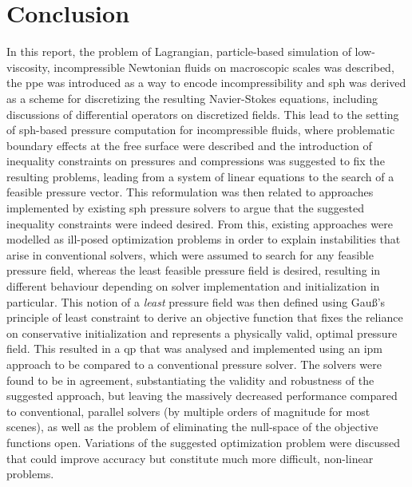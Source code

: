 \documentclass[conference]{IEEEtran}
\begin{document}
\section{Conclusion}
In this report, the problem of Lagrangian, particle-based simulation of low-viscosity, incompressible Newtonian fluids on macroscopic scales was described, the \acf{ppe} was introduced as a way to encode incompressibility and \ac{sph} was derived as a scheme for discretizing the resulting Navier-Stokes equations, including discussions of differential operators on discretized fields. This lead to the setting of \ac{sph}-based pressure computation for incompressible fluids, where problematic boundary effects at the free surface were described and the introduction of inequality constraints on pressures and compressions was suggested to fix the resulting problems, leading from a system of linear equations to the search of a feasible pressure vector. This reformulation was then related to approaches implemented by existing \ac{sph} pressure solvers to argue that the suggested inequality constraints were indeed desired. From this, existing approaches were modelled as ill-posed optimization problems in order to explain instabilities that arise in conventional solvers, which were assumed to search for any feasible pressure field, whereas the least feasible pressure field is desired, resulting in different behaviour depending on solver implementation and initialization in particular. This notion of a \textit{least} pressure field was then defined using Gau\ss's principle of least constraint to derive an objective function that fixes the reliance on conservative initialization and represents a physically valid, optimal pressure field. This resulted in a \ac{qp} that was analysed and implemented using an \ac{ipm} approach to be compared to a conventional pressure solver. The solvers were found to be in agreement, substantiating the validity and robustness of the suggested approach, but leaving the massively decreased performance compared to conventional, parallel solvers (by multiple orders of magnitude for most scenes), as well as the problem of eliminating the null-space of the objective functions open. Variations of the suggested optimization problem were discussed that could improve accuracy but constitute much more difficult, non-linear problems. 

% 
% 
\printbibliography
\end{document}
